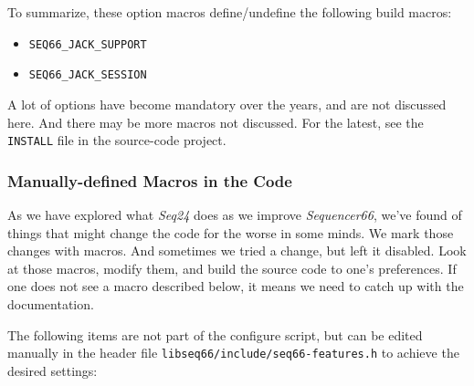     To summarize, these option macros define/undefine the following build
    macros:

      \begin{itemize}
        \item \texttt{SEQ66\_JACK\_SUPPORT}
        \item \texttt{SEQ66\_JACK\_SESSION}
      \end{itemize}

   A lot of options have become mandatory over the years, and are not discussed
   here.  And there may be more macros not discussed.  For the latest, see the
   \texttt{INSTALL} file in the source-code project.

\subsubsection{Manually-defined Macros in the Code}
\label{subsubsec:seq66_build_macros}

   As we have explored what \textsl{Seq24} does as we improve
   \textsl{Sequencer66}, we've found of things that might change the code
   for the worse in some minds.
   We mark those changes with macros.
   And sometimes we tried a change, but left it disabled.
   Look at those macros, modify them, and build
   the source code to one's preferences.  If one does not see a macro described
   below, it means we need to catch up with the documentation.

   The following items are not part of the configure script, but can
   be edited manually in the header file
   \texttt{libseq66/include/seq66-features.h}
   to achieve the desired settings:

   \setcounter{ItemCounter}{0}      %
   
